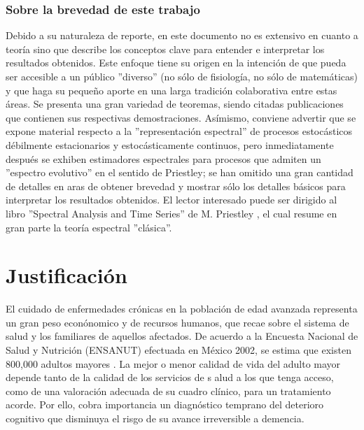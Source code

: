 \documentclass[12pt,a4paper]{mitthesis}
\begin{document}
\subsubsection{Sobre la brevedad de este trabajo}

Debido a su naturaleza de reporte, en este documento no es extensivo en cuanto a teor\'ia sino que
describe los conceptos clave para entender e interpretar los resultados obtenidos.
Este enfoque tiene su origen en la intenci\'on de que pueda 
ser accesible a un p\'ublico ''diverso'' (no s\'olo de fisiolog\'ia, no s\'olo de matem\'aticas)
y que haga su peque\~no aporte en una larga tradici\'on colaborativa entre estas \'areas.
Se presenta una gran variedad de teoremas, siendo citadas publicaciones que contienen
sus respectivas demostraciones. As\'imismo, conviene advertir que se expone material respecto a
la ''representaci\'on espectral'' de procesos estoc\'asticos d\'ebilmente estacionarios y
estoc\'asticamente continuos, pero inmediatamente despu\'es 
se exhiben estimadores espectrales para procesos 
que admiten un ''espectro evolutivo'' en el sentido de Priestley; se han omitido una gran cantidad
de detalles en aras de obtener brevedad y mostrar s\'olo los detalles b\'asicos
para interpretar los resultados obtenidos. 
El lector interesado puede ser dirigido al libro ''Spectral Analysis and Time Series'' de
M. Priestley \cite{Priestley81}, el cual resume en gran parte la teor\'ia espectral ''cl\'asica''.


\section{Justificaci\'on}

El cuidado de enfermedades cr\'onicas en la poblaci\'on de edad avanzada representa un gran peso 
econ\'onomico y de recursos humanos, que recae sobre el sistema de salud y los familiares de 
aquellos afectados. 
De acuerdo a la Encuesta Nacional de Salud y Nutrici\'on (ENSANUT) efectuada en M\'exico 2002, se 
estima que existen 800,000 adultos mayores \cite{Sosa12}. 
La mejor o menor calidad de vida del adulto mayor depende tanto de la calidad de los servicios de s
alud a los que tenga acceso, como de una valoraci\'on adecuada de su cuadro cl\'inico, para un 
tratamiento acorde. Por ello, cobra importancia un diagn\'ostico temprano del deterioro cognitivo 
que disminuya el risgo de su avance irreversible a demencia.
\end{document}
